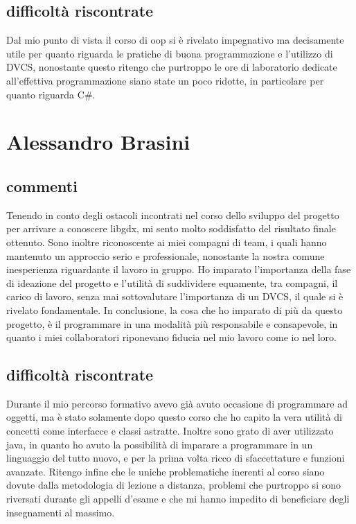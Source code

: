 \documentclass[a4paper,12pt]{report}
\begin{document}
\subsection{difficoltà riscontrate}
Dal mio punto di vista il corso di oop si è rivelato impegnativo ma decisamente utile per quanto riguarda le pratiche di buona programmazione e l'utilizzo di DVCS, nonostante questo ritengo che purtroppo le ore di laboratorio dedicate all'effettiva programmazione siano state un poco ridotte, in particolare per quanto riguarda C\#.
\newpage

\section{Alessandro Brasini}
\subsection{commenti}
Tenendo in conto degli ostacoli incontrati nel corso dello sviluppo del progetto per arrivare a conoscere libgdx, mi sento molto soddisfatto del risultato finale ottenuto.
Sono inoltre riconoscente ai miei compagni di team, i quali hanno mantenuto un approccio serio e professionale, nonostante la nostra comune inesperienza riguardante il lavoro in gruppo.
Ho imparato l'importanza della fase di ideazione del progetto e l'utilità di suddividere equamente, tra compagni, il carico di lavoro, senza mai sottovalutare l'importanza di un DVCS, il quale si è rivelato fondamentale.
In conclusione, la cosa che ho imparato di più da questo progetto, è il programmare in una modalità più responsabile e consapevole, in quanto i miei collaboratori riponevano fiducia nel mio lavoro come io nel loro.
\subsection{difficoltà riscontrate}
Durante il mio percorso formativo avevo già avuto occasione di programmare ad oggetti, ma è stato solamente dopo questo corso che ho capito la vera utilità di concetti come interfacce e classi astratte. Inoltre sono grato di aver utilizzato java, in quanto ho avuto la possibilità di imparare a programmare in un linguaggio del tutto nuovo, e per la prima volta ricco di sfaccettature e funzioni avanzate.
Ritengo infine che le uniche problematiche inerenti al corso siano dovute dalla metodologia di lezione a distanza, problemi che purtroppo si sono riversati durante gli appelli d'esame e che mi hanno impedito di beneficiare degli insegnamenti al massimo.
\newpage
\end{document}
